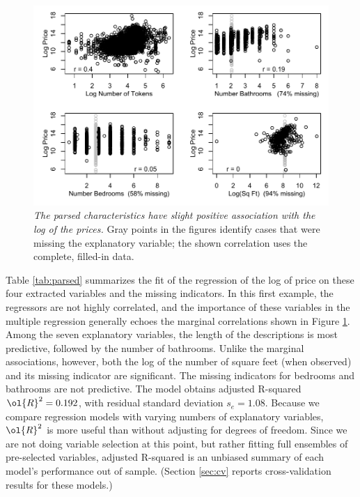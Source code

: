 \documentclass[12pt]{article}
\begin{document}
 \begin{figure}
  \caption{ \label{fig:parsed} { \sl The parsed characteristics have slight
 positive association with the log of the prices. } Gray points in the figures
 identify cases that were missing the explanatory variable; the shown
 correlation uses the complete, filled-in data. }

 \centerline{
 \vspace{0.1in}
 \includegraphics[width=5in]{figures/parsed} }
 \vspace{0.2in}
 \end{figure}


 Table \ref{tab:parsed} summarizes the fit of the regression of the log of price
 on these four extracted variables and the missing indicators.   In this first example, the regressors are not highly correlated, and the importance of these variables in the multiple regression generally echoes the marginal correlations shown in Figure \ref{fig:parsed}.  Among the seven explanatory variables, the length of the descriptions is most predictive, followed by the number of bathrooms.  Unlike the marginal associations, however, both the log of the number of square feet (when observed) and its missing indicator are significant.  The missing indicators for bedrooms and bathrooms are not predictive.  The model
 obtains adjusted R-squared $\ol{R}^2 = 0.192$, with residual standard deviation $s_e =1.08$.  Because we compare regression models with varying numbers of explanatory variables, $\ol{R}^2$ is more useful than without adjusting for degrees of freedom.  Since
 we are not doing variable selection at this point, but rather fitting full ensembles of
 pre-selected variables, adjusted R-squared is an unbiased summary of each
 model's performance out of sample.  (Section \ref{sec:cv} reports cross-validation results for these models.) 
\end{document}
